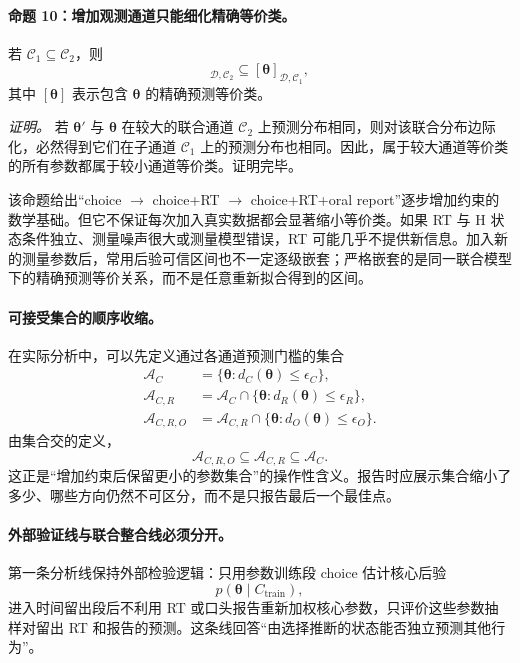 \paragraph{命题 10：增加观测通道只能细化精确等价类。}
若 $\mathcal C_1\subseteq\mathcal C_2$，则
\begin{equation}
    [\boldsymbol\theta]_{\mathcal D,\mathcal C_2}
    \subseteq
    [\boldsymbol\theta]_{\mathcal D,\mathcal C_1},
    \label{eq:model0803-equivalence-refinement}
\end{equation}
其中 $[\boldsymbol\theta]$ 表示包含 $\boldsymbol\theta$ 的精确预测等价类。

\textit{证明。}
若 $\boldsymbol\theta'$ 与 $\boldsymbol\theta$ 在较大的联合通道 $\mathcal C_2$ 上预测分布相同，则对该联合分布边际化，必然得到它们在子通道 $\mathcal C_1$ 上的预测分布也相同。因此，属于较大通道等价类的所有参数都属于较小通道等价类。证明完毕。

该命题给出“choice $\rightarrow$ choice+RT $\rightarrow$ choice+RT+oral report”逐步增加约束的数学基础。但它不保证每次加入真实数据都会显著缩小等价类。如果 RT 与 H 状态条件独立、测量噪声很大或测量模型错误，RT 可能几乎不提供新信息。加入新的测量参数后，常用后验可信区间也不一定逐级嵌套；严格嵌套的是同一联合模型下的精确预测等价关系，而不是任意重新拟合得到的区间。

\paragraph{可接受集合的顺序收缩。}
在实际分析中，可以先定义通过各通道预测门槛的集合
\begin{align}
    \mathcal A_C
    &=\{\boldsymbol\theta:
      d_C(\boldsymbol\theta)\leq\epsilon_C\},\\
    \mathcal A_{C,R}
    &=\mathcal A_C\cap
      \{\boldsymbol\theta:
      d_R(\boldsymbol\theta)\leq\epsilon_R\},\\
    \mathcal A_{C,R,O}
    &=\mathcal A_{C,R}\cap
      \{\boldsymbol\theta:
      d_O(\boldsymbol\theta)\leq\epsilon_O\}.
    \label{eq:model0803-acceptable-sets}
\end{align}
由集合交的定义，
\begin{equation}
    \mathcal A_{C,R,O}
    \subseteq\mathcal A_{C,R}
    \subseteq\mathcal A_C.
    \label{eq:model0803-acceptable-nesting}
\end{equation}
这正是“增加约束后保留更小的参数集合”的操作性含义。报告时应展示集合缩小了多少、哪些方向仍然不可区分，而不是只报告最后一个最佳点。

\paragraph{外部验证线与联合整合线必须分开。}
第一条分析线保持外部检验逻辑：只用参数训练段 choice 估计核心后验
\begin{equation}
    p(\boldsymbol\theta\mid C_{\mathrm{train}}),
\end{equation}
进入时间留出段后不利用 RT 或口头报告重新加权核心参数，只评价这些参数抽样对留出 RT 和报告的预测。这条线回答“由选择推断的状态能否独立预测其他行为”。

